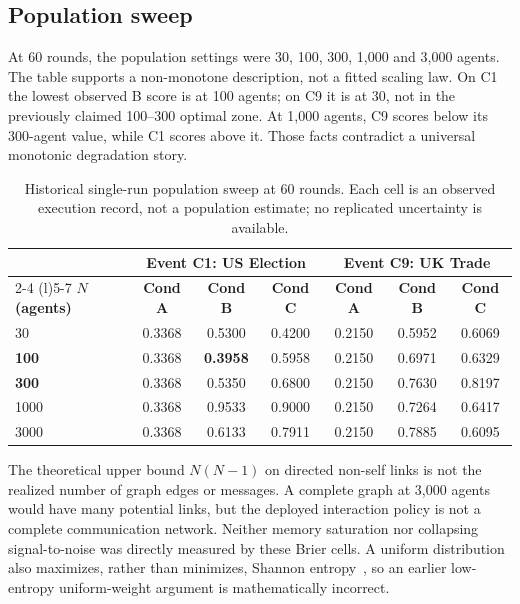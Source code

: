 \subsection{Population sweep}
\label{sec:n_scaling}
At 60 rounds, the population settings were 30, 100, 300, 1,000 and 3,000 agents. The table supports a non-monotone description, not a fitted scaling law. On C1 the lowest observed B score is at 100 agents; on C9 it is at 30, not in the previously claimed 100--300 optimal zone. At 1,000 agents, C9 scores below its 300-agent value, while C1 scores above it. Those facts contradict a universal monotonic degradation story.
\begin{table}[!htbp]
\centering
\caption{Historical single-run population sweep at 60 rounds. Each cell is an observed execution record, not a population estimate; no replicated uncertainty is available.}
\label{tab:n_sweep_results}
\begin{tabular}{lcccccc}
\toprule
 & \multicolumn{3}{c}{\textbf{Event C1: US Election}} & \multicolumn{3}{c}{\textbf{Event C9: UK Trade}} \\
\cmidrule(r){2-4} \cmidrule(l){5-7}
\textbf{$N$ (agents)} & \textbf{Cond A} & \textbf{Cond B} & \textbf{Cond C} & \textbf{Cond A} & \textbf{Cond B} & \textbf{Cond C} \\
\midrule
30      & 0.3368 & 0.5300 & 0.4200 & 0.2150 & 0.5952 & 0.6069 \\
\textbf{100}     & 0.3368 & \textbf{0.3958} & 0.5958 & 0.2150 & 0.6971 & 0.6329 \\
\textbf{300}     & 0.3368 & 0.5350 & 0.6800 & 0.2150 & 0.7630 & 0.8197 \\
1000    & 0.3368 & 0.9533 & 0.9000 & 0.2150 & 0.7264 & 0.6417 \\
3000    & 0.3368 & 0.6133 & 0.7911 & 0.2150 & 0.7885 & 0.6095 \\
\bottomrule
\end{tabular}
\setlength{\tabcolsep}{6pt}
\end{table}
The theoretical upper bound $N(N-1)$ on directed non-self links is not the realized number of graph edges or messages. A complete graph at 3,000 agents would have many potential links, but the deployed interaction policy is not a complete communication network. Neither memory saturation nor collapsing signal-to-noise was directly measured by these Brier cells. A uniform distribution also maximizes, rather than minimizes, Shannon entropy~\cite{shannon1948}, so an earlier low-entropy uniform-weight argument is mathematically incorrect.

